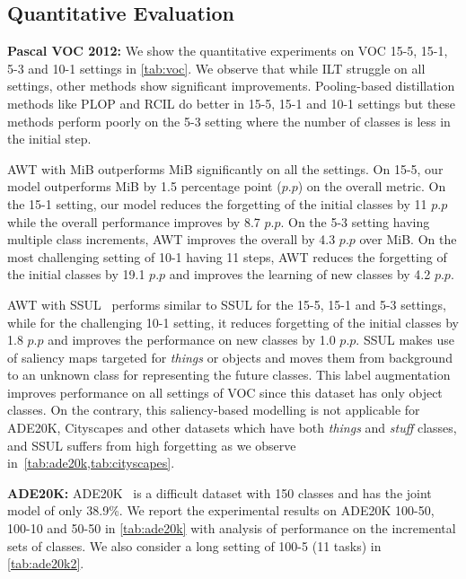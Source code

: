\subsection{Quantitative Evaluation}

\noindent\textbf{Pascal VOC 2012:} We show the quantitative experiments on VOC 15-5, 15-1, 5-3 and 10-1 settings in \cref{tab:voc}. We observe that while ILT struggle on all settings, other methods show significant improvements. Pooling-based distillation methods like PLOP and RCIL do better in 15-5, 15-1 and 10-1 settings but these methods perform poorly on the 5-3 setting where the number of classes is less in the initial step.

AWT with MiB outperforms MiB significantly on all the settings. On 15-5, our model outperforms MiB by 1.5 percentage point ($p.p$) on the overall \miou{} metric. On the 15-1 setting, our model reduces the forgetting of the initial classes by 11 $p.p$ while the overall performance improves by 8.7 $p.p$. On the 5-3 setting having multiple class increments, AWT improves the overall \miou{} by 4.3 $p.p$ over MiB. On the most challenging setting of 10-1 having 11 steps, AWT reduces the forgetting of the initial classes by 19.1 $p.p$ and improves the learning of new classes by 4.2 $p.p$. 

AWT with SSUL~\cite{cha2021ssul} performs similar to SSUL for the 15-5, 15-1 and 5-3 settings, while for the challenging 10-1 setting, it reduces forgetting of the initial classes by 1.8 $p.p$ and improves the performance on new classes by 1.0 $p.p$. SSUL makes use of saliency maps targeted for \emph{things} or objects and moves them from background to an unknown class for representing the future classes. This label augmentation improves performance on all settings of VOC since this dataset has only object classes. On the contrary, this saliency-based modelling is not applicable for ADE20K, Cityscapes and other datasets which have both \emph{things} and \emph{stuff} classes, and SSUL suffers from high forgetting as we observe in~\cref{tab:ade20k,tab:cityscapes}.


\noindent\textbf{ADE20K:} ADE20K~\cite{zhou2017scene} is a difficult dataset with 150 classes and has the joint model \miou{} of only 38.9\%. We report the experimental results on ADE20K 100-50, 100-10 and 50-50 in \cref{tab:ade20k} with analysis of performance on the incremental sets of classes. We also consider a long setting of 100-5 (11 tasks) in \cref{tab:ade20k2}. 



